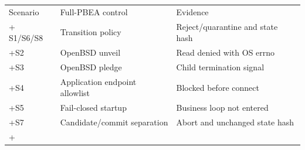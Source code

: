 \begin{tabular}{lll}
\toprule
Scenario & Full-PBEA control & Evidence \\
+\midrule
S1/S6/S8 & Transition policy & Reject/quarantine and state hash \\
+S2 & OpenBSD unveil & Read denied with OS errno \\
+S3 & OpenBSD pledge & Child termination signal \\
+S4 & Application endpoint allowlist & Blocked before connect \\
+S5 & Fail-closed startup & Business loop not entered \\
+S7 & Candidate/commit separation & Abort and unchanged state hash \\
+\bottomrule
\end{tabular}
